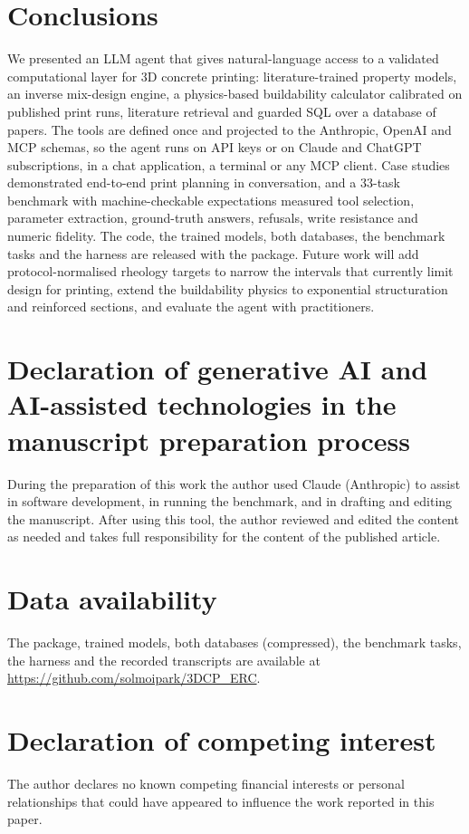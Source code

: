 \documentclass[preprint,12pt]{elsarticle}
\begin{document}
\section{Conclusions}\label{sec:conclusion}

We presented an LLM agent that gives natural-language access to a validated computational layer for 3D concrete printing: \nnModels{} literature-trained property models, an inverse mix-design engine, a physics-based buildability calculator calibrated on \nprintRuns{} published print runs, literature retrieval and guarded SQL over a database of \npapers{} papers. The \nnTools{} tools are defined once and projected to the Anthropic, OpenAI and MCP schemas, so the agent runs on API keys or on Claude and ChatGPT subscriptions, in a chat application, a terminal or any MCP client. Case studies demonstrated end-to-end print planning in conversation, and a 33-task benchmark with machine-checkable expectations measured tool selection, parameter extraction, ground-truth answers, refusals, write resistance and numeric fidelity. The code, the trained models, both databases, the benchmark tasks and the harness are released with the package. Future work will add protocol-normalised rheology targets to narrow the intervals that currently limit design for printing, extend the buildability physics to exponential structuration and reinforced sections, and evaluate the agent with practitioners.

\section*{Declaration of generative AI and AI-assisted technologies in the manuscript preparation process}
During the preparation of this work the author used Claude (Anthropic) to assist in software development, in running the benchmark, and in drafting and editing the manuscript. After using this tool, the author reviewed and edited the content as needed and takes full responsibility for the content of the published article.

\section*{Data availability}
The package, trained models, both databases (compressed), the benchmark tasks, the harness and the recorded transcripts are available at \url{https://github.com/solmoipark/3DCP_ERC}.

\section*{Declaration of competing interest}
The author declares no known competing financial interests or personal relationships that could have appeared to influence the work reported in this paper.
\end{document}
